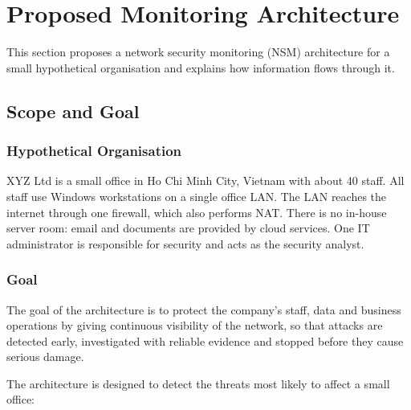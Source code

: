 \section{Proposed Monitoring Architecture}
\label{sec:architecture}

This section proposes a network security monitoring (NSM) architecture for a small hypothetical organisation and explains how information flows through it.

\subsection{Scope and Goal}

\subsubsection{Hypothetical Organisation}

XYZ Ltd is a small office in Ho Chi Minh City, Vietnam with about 40 staff. All staff use Windows workstations on a single office LAN. The LAN reaches the internet through one firewall, which also performs NAT. There is no in-house server room: email and documents are provided by cloud services. One IT administrator is responsible for security and acts as the security analyst.

\subsubsection{Goal}

The goal of the architecture is to protect the company's staff, data and business operations by giving continuous visibility of the network, so that attacks are detected early, investigated with reliable evidence and stopped before they cause serious damage.

The architecture is designed to detect the threats most likely to affect a small office:

